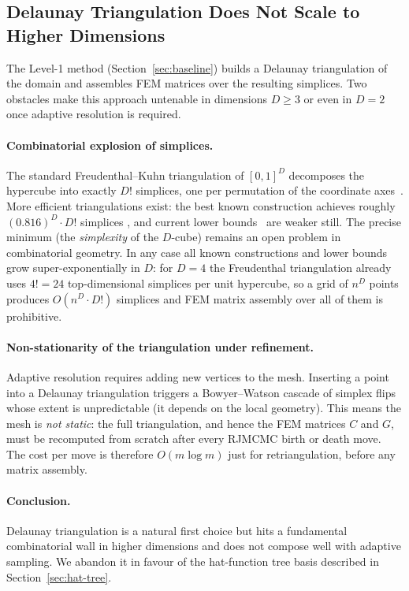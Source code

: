 \documentclass[11pt]{article}
\begin{document}
\subsection{Delaunay Triangulation Does Not Scale to Higher Dimensions}
\label{sec:lesson-delaunay}

The Level-1 method (Section~\ref{sec:baseline}) builds a Delaunay
triangulation of the domain and assembles FEM matrices over the resulting
simplices.  Two obstacles make this approach untenable in dimensions $D \ge 3$
or even in $D=2$ once adaptive resolution is required.

\paragraph{Combinatorial explosion of simplices.}
The standard Freudenthal--Kuhn triangulation of $[0,1]^D$ decomposes the
hypercube into exactly $D!$ simplices, one per permutation of the coordinate
axes~\citep{freudenthal1942}.  More efficient triangulations exist: the best
known construction achieves roughly $(0.816)^D \cdot D!$ simplices
\citep{ordensantos2003}, and current lower bounds~\citep{glazyrin2012} are
weaker still.  The precise minimum (the \emph{simplexity} of the $D$-cube)
remains an open problem in combinatorial geometry.  In any case all known
constructions and lower bounds grow super-exponentially in $D$: for $D=4$ the
Freudenthal triangulation already uses $4! = 24$ top-dimensional simplices per
unit hypercube, so a grid of $n^D$ points produces $O(n^D \cdot D!)$ simplices
and FEM matrix assembly over all of them is prohibitive.

\paragraph{Non-stationarity of the triangulation under refinement.}
Adaptive resolution requires adding new vertices to the mesh.  Inserting a
point into a Delaunay triangulation triggers a Bowyer--Watson cascade of
simplex flips whose extent is unpredictable (it depends on the local geometry).
This means the mesh is \emph{not static}: the full triangulation, and hence the
FEM matrices $C$ and $G$, must be recomputed from scratch after every RJMCMC
birth or death move.  The cost per move is therefore $O(m \log m)$ just for
retriangulation, before any matrix assembly.

\paragraph{Conclusion.}
Delaunay triangulation is a natural first choice but hits a fundamental
combinatorial wall in higher dimensions and does not compose well with adaptive
sampling.  We abandon it in favour of the hat-function tree basis described in
Section~\ref{sec:hat-tree}.
\end{document}
